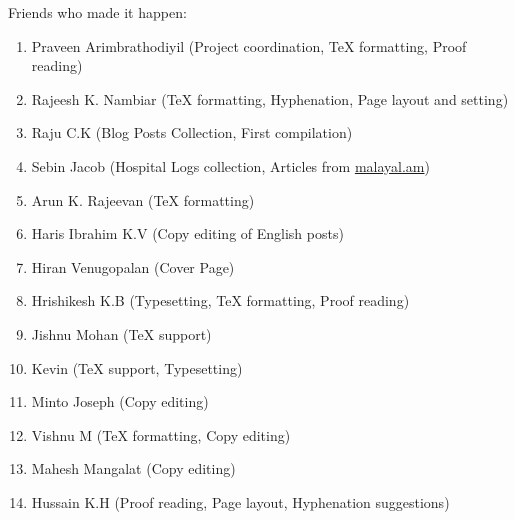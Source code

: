 \begin{english}
Friends who made it happen:
\begin{enumerate}
 \itemsep0em
 \item Praveen Arimbrathodiyil (Project coordination, {\TeX} formatting, Proof reading)
 \item Rajeesh K. Nambiar ({\TeX} formatting, Hyphenation, Page layout and setting)
 \item Raju C.K (Blog Posts Collection, First compilation)
 \item Sebin Jacob (Hospital Logs collection, Articles from \url{malayal.am})
 \item Arun K. Rajeevan ({\TeX} formatting)
 \item Haris Ibrahim K.V (Copy editing of English posts)
 \item Hiran Venugopalan (Cover Page)
 \item Hrishikesh K.B (Typesetting, {\TeX} formatting, Proof reading)
 \item Jishnu Mohan ({\TeX} support)
 \item Kevin ({\TeX} support, Typesetting)
 \item Minto Joseph (Copy editing)
 \item Vishnu M ({\TeX} formatting, Copy editing)
 \item Mahesh Mangalat (Copy editing)
 \item Hussain K.H (Proof reading, Page layout, Hyphenation suggestions)
\end{enumerate}
\end{english}
\newpage
